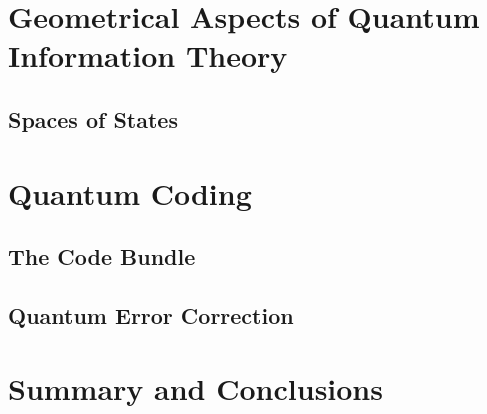 \documentclass[titlepage,12pt]{utarticle}
\begin{document}
\section{Geometrical Aspects of Quantum Information Theory} 


\subsection{Spaces of States}


\section{Quantum Coding}
\label{sec:quantumCoding}


\subsection{The Code Bundle}


\subsection{Quantum Error Correction}

\section{Summary and Conclusions} 


\end{document}
